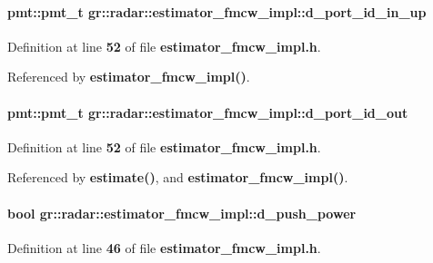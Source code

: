 \paragraph[{d\+\_\+port\+\_\+id\+\_\+in\+\_\+up}]{\setlength{\rightskip}{0pt plus 5cm}pmt\+::pmt\+\_\+t gr\+::radar\+::estimator\+\_\+fmcw\+\_\+impl\+::d\+\_\+port\+\_\+id\+\_\+in\+\_\+up}\label{classgr_1_1radar_1_1estimator__fmcw__impl_a1de4e0ca6e2267e1fb92da0cc06f9bab}


Definition at line {\bf 52} of file {\bf estimator\+\_\+fmcw\+\_\+impl.\+h}.



Referenced by {\bf estimator\+\_\+fmcw\+\_\+impl()}.

\paragraph[{d\+\_\+port\+\_\+id\+\_\+out}]{\setlength{\rightskip}{0pt plus 5cm}pmt\+::pmt\+\_\+t gr\+::radar\+::estimator\+\_\+fmcw\+\_\+impl\+::d\+\_\+port\+\_\+id\+\_\+out}\label{classgr_1_1radar_1_1estimator__fmcw__impl_acb2c78805f434d3528cc7e6867b38d20}


Definition at line {\bf 52} of file {\bf estimator\+\_\+fmcw\+\_\+impl.\+h}.



Referenced by {\bf estimate()}, and {\bf estimator\+\_\+fmcw\+\_\+impl()}.

\paragraph[{d\+\_\+push\+\_\+power}]{\setlength{\rightskip}{0pt plus 5cm}bool gr\+::radar\+::estimator\+\_\+fmcw\+\_\+impl\+::d\+\_\+push\+\_\+power}\label{classgr_1_1radar_1_1estimator__fmcw__impl_add4a453b9e8469b98d6d04dba5eda36c}


Definition at line {\bf 46} of file {\bf estimator\+\_\+fmcw\+\_\+impl.\+h}.



